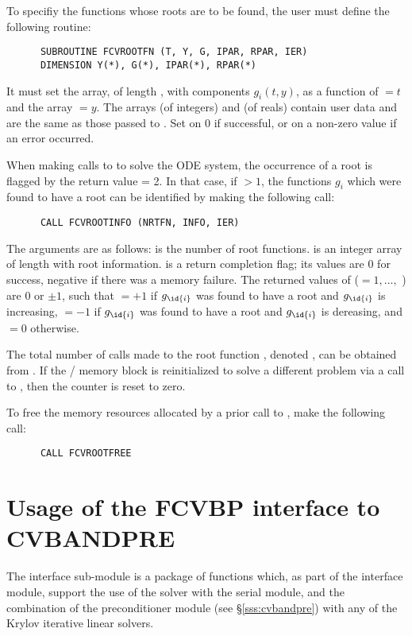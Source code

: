 To specifiy the functions whose roots are to be found, the user must
define the following routine:
\begin{verbatim}
      SUBROUTINE FCVROOTFN (T, Y, G, IPAR, RPAR, IER)
      DIMENSION Y(*), G(*), IPAR(*), RPAR(*)
\end{verbatim}
It must set the  array, of length , with components $g_i(t,y)$,
as a function of  $= t$ and the array  $= y$.  
The arrays  (of integers) and  (of reals) contain user data
and are the same as those passed to .
Set  on 0 if successful, or on a non-zero value if an error occurred.

When making calls to  to solve the ODE system, the occurrence of
a root is flagged by the return value  = 2.  In that case, if
 $> 1$, the functions $g_i$ which were found to have a root can
be identified by making the following call:
\begin{verbatim}
      CALL FCVROOTINFO (NRTFN, INFO, IER)
\end{verbatim}
The arguments are as follows:  is the number of root functions.
 is an integer array of length  with root information.
 is a return completion flag; its values are $0$ for success, 
negative if there was a memory failure.  The returned values of 
($ = 1,\ldots,$ ) are $0$ or $\pm 1$, such that 
 $ = +1$ if $g_{\id{i}}$ was found to have a root and $g_{\id{i}}$ is increasing,
 $ = -1$ if $g_{\id{i}}$ was found to have a root and $g_{\id{i}}$ is dereasing,
and  $ = 0$ otherwise.

The total number of calls made to the root function ,
denoted , can be obtained from .
If the {\fcvode}/{\cvode} memory block is reinitialized to solve a
different problem via a call to , then the counter
 is reset to zero.

To free the memory resources allocated by a prior call to , make
the following call:
\begin{verbatim}
      CALL FCVROOTFREE
\end{verbatim}


\section{Usage of the FCVBP interface to CVBANDPRE}
The {\fcvbp} interface sub-module is a package of {\CC} functions which,
as part of the {\fcvode} interface module, support the use of the
{\cvode} solver with the serial {\nvecs} module, and the combination of
the {\cvbandpre} preconditioner module (see \S\ref{sss:cvbandpre}) with
any of the Krylov iterative linear solvers.

